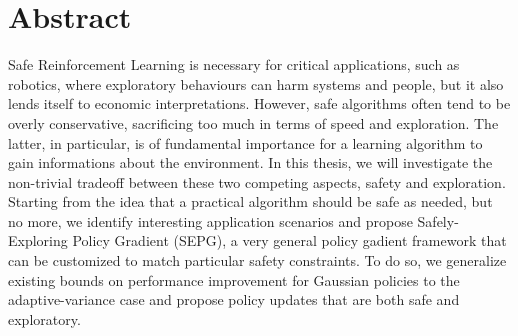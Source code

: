 \chapter*{Abstract}
\thispagestyle{empty}

Safe Reinforcement Learning is necessary for critical applications, such as robotics, where exploratory behaviours can harm systems and people, but it also lends itself to economic interpretations. However, safe algorithms often tend to be overly conservative, sacrificing too much in terms of speed and exploration. The latter, in particular, is of fundamental importance for a learning algorithm to gain informations about the environment. In this thesis, we will investigate the non-trivial tradeoff between these two competing aspects, safety and exploration. 
Starting from the idea that a practical algorithm should be safe as needed, but no more, we identify interesting application scenarios and propose Safely-Exploring Policy Gradient (SEPG), a very general policy gadient framework that can be customized to match particular safety constraints. To do so, we generalize existing bounds on performance improvement for Gaussian policies to the adaptive-variance case and propose policy updates that are both safe and exploratory. 
